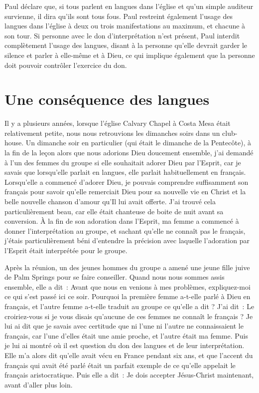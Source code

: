 Paul déclare que, si tous parlent en langues dans l'église et qu'un simple
 auditeur survienne, il dira qu'ils sont tous fous.
 Paul restreint également l'usage des langues dans l'église à deux ou trois
 manifestations au maximum, et chacune à son tour.
 Si personne avec le don d'interprétation n'est présent, Paul interdit
 complètement l'usage des langues, disant à la personne qu'elle devrait
 garder le silence et parler à elle-même et à Dieu,
 ce qui implique également que la personne doit pouvoir contrôler
 l'exercice du don.


\section{Une cons\'equence des langues}

Il y a plusieurs années, lorsque l'église Calvary Chapel à Costa Mesa était
 relativement petite, nous nous retrouvions les dimanches soirs dans un
 club-house. Un dimanche soir en particulier (qui était le dimanche
 de la Pentecôte), à la fin de la leçon alors que nous adorions Dieu
 doucement ensemble, j'ai demandé à l'un des femmes du groupe si elle
 souhaitait adorer Dieu par l'Esprit, car je savais que lorsqu'elle parlait
 en langues, elle parlait habituellement en français.
 Lorsqu'elle a commencé d'adorer Dieu, je pouvais comprendre suffisamment
 son français pour savoir qu'elle remerciait Dieu pour sa nouvelle vie
 en Christ et la belle nouvelle chanson d'amour qu'Il lui avait offerte.
 J'ai trouvé cela particulièrement beau, car elle était chanteuse de boite
 de nuit avant sa conversion. À la fin de son adoration dans l'Esprit,
 ma femme a commencé à donner l'interprétation au groupe, et sachant
 qu'elle ne connaît pas le français, j'étais particulièrement béni
 d'entendre la précision avec laquelle l'adoration par l'Esprit
 était interprétée pour le groupe.

Après la réunion, un des jeunes hommes du groupe a amené une jeune fille
 juive de Palm Springs pour se faire conseiller. Quand nous nous sommes
 assis ensemble, elle a dit~: \og Avant que nous en venions à mes problèmes,
 expliquez-moi ce qui s'est passé ici ce soir. Pourquoi la première
 femme a-t-elle parlé à Dieu en français, et l'autre femme a-t-elle
 traduit au groupe ce qu'elle a dit ? \fg{}
 J'ai dit~: \og Le croiriez-vous si je vous disais qu'aucune de ces femmes
 ne connaît le français ? \fg{} Je lui ai dit que je savais avec certitude
 que ni l'une ni l'autre ne connaissaient le français, car l'une d'elles
 était une amie proche, et l'autre était ma femme. Puis je lui ai montré
  où il est question du don des langues
 et de leur in\-ter\-pré\-ta\-tion. Elle m'a alors dit qu'elle avait vécu en France
 pendant six ans, et que l'accent du français qui avait été parlé était
 un parfait exemple de ce qu'elle appelait le français aristocratique.
 Puis elle a dit~: \og Je dois accepter Jésus-Christ maintenant,
 avant d'aller plus loin. \fg{}

